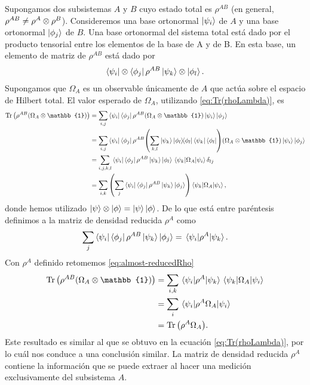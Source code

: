 Supongamos dos subsistemas $A$ y $B$ cuyo estado total es 
$\rho^{AB}$ (en general, $\rho^{AB}\neq \rho^A\otimes \rho^B$). 
Consideremos una base ortonormal $\ket{\psi_i}$ de $A$ y una 
base ortonormal $\ket{\phi_j}$ de $B$. Una base ortonormal 
del sistema total está dado por el producto tensorial entre los elementos
de la base de A y de B. En esta base, un elemento de matriz
de $\rho^{AB}$ está dado por
\begin{align}
	\bra{\psi_i}\otimes\bra{\phi_j}\rho^{AB}\ket{\psi_k}\otimes\ket{\phi_l}.
\end{align}
Supongamos que $\Omega_A$ es un observable únicamente de $A$
que actúa sobre el espacio de Hilbert total. El valor esperado de 
$\Omega_A$, utilizando \eqref{eq:Tr(rhoLambda)}, es
\begin{align}
	\Tr \qty(\rho^{AB}\qty(\Omega_A\ot \mathbb{1})) &= \sum _{i,j} 
	\bra{\psi_i}\bra{\phi_j}\rho^{AB}\qty(\Omega_A\ot \mathbb{1})
	\ket{\psi_i}\ket{\phi_j} 
	\nonumber\\
	&= \sum _{i,j} 
	\bra{\psi_i} \bra{\phi_j}\rho^{AB}
	\qty(\sum _{k,l} \ket{\psi_k} \dyad{\phi_l}
	\bra{\psi_k} \bra{\phi_l} )
	\qty(\Omega_A\ot \mathbb{1})\ket{\psi_i} \ket{\phi_j}\nonumber\\
	&= \sum _{i,j,k,l} 
	\bra{\psi_i} \bra{\phi_j}\rho^{AB}\ket{\psi_k} \ket{\phi_l}
	\matrixel{\psi_k}{\Omega_A}{\psi_i}\delta _{lj}\nonumber\\
	&= \sum_{i,k}\qty(\sum _j 
	\bra{\psi_i} \bra{\phi_j}\rho^{AB}\ket{\psi_k} \ket{\phi_j})
	\matrixel{\psi_k}{\Omega_A}{\psi_i},
	\label{eq:almost-reducedRho}
\end{align}
donde hemos utilizado $\ket{\psi}\otimes\ket{\phi}=\ket{\psi}\ket{\phi}$.
De lo que está entre paréntesis definimos a la matriz de densidad
reducida $\rho^A$ como~\cite{chandra2013quantum}
\begin{align}
	\sum _j \bra{\psi_i}\bra{\phi_j}\rho^{AB}\ket{\psi_k}\ket{\phi_j}
	= \matrixel{\psi_i}{\rho^A}{\psi_k}.
	\label{eq:reducedRho-def1}
\end{align}
Con $\rho^A$ definido retomemos  \eqref{eq:almost-reducedRho}
\begin{align}
	\Tr \qty(\rho^{AB}\qty(\Omega_A\ot \mathbb{1}))&= \sum _{i,k}\nonumber
	\matrixel{\psi_i}{\rho^A}{\psi_k} \matrixel{\psi_k}{\Omega_A}{\psi_i}
	\nonumber\\
	&= \sum_i \matrixel{\psi_i}{\rho^A\Omega_A}{\psi_i}\nonumber\\
	&= \Tr \qty(\rho^A\Omega_A). \label{eq:reduced-works}
\end{align}
Este resultado es similar al que se obtuvo en la ecuación
\eqref{eq:Tr(rhoLambda)}, por lo cuál nos conduce a una
conclusión similar. La matriz de densidad reducida $\rho^A$ 
contiene la información que se puede extraer al 
hacer una medición exclusivamente del subsistema $A$.


